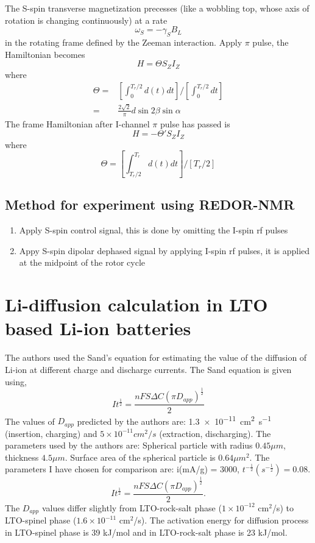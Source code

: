 \documentclass[12pt]{book}
\begin{document}
The S-spin transverse magnetization precesses (like a wobbling top, whose axis of rotation is changing continuously) at a rate
\[
\omega_{S}=-\gamma_{S}B_{L}
\]
in the rotating frame defined by the Zeeman interaction. Apply $\pi$ pulse, the Hamiltonian becomes 
\[
H=\Theta S_{Z}I_{Z}
\]
where 
\begin{align*}
\Theta= & \left[\int_{0}^{T_{r}/2}d\left(t\right)dt\right]/\left[\int_{0}^{T_{r}/2}dt\right]\\
= & \frac{2\sqrt{2}}{\pi}d\sin2\beta\sin\alpha
\end{align*}
The frame Hamiltonian after I-channel $\pi$ pulse has passed is 
\[
H=-\Theta'S_{Z}I_{Z}
\]
where 
\[
\Theta=\left[\int_{T_{r}/2}^{T_{r}}d\left(t\right)dt\right]/\left[T_{r}/2\right]
\]


\subsection{Method for experiment using REDOR-NMR}
\begin{enumerate}
	\item Apply S-spin control signal, this is done by omitting the I-spin rf
	pulses
	\item Appy S-spin dipolar dephased signal by applying I-spin rf pulses,
	it is applied at the midpoint of the rotor cycle
\end{enumerate}

\section{Li-diffusion calculation in LTO based Li-ion batteries}

The authors used the Sand's equation for estimating the value of the diffusion of Li-ion at different charge and discharge currents. The Sand equation is given using,  \[
It^{\frac{1}{2}}=\frac{nFS\Delta C\left(\pi D_{app}\right)^{\frac{1}{2}}}{2}
\]
The values of $D_{app}$ predicted by the authors are: \SI{1.3e-11}{\centi\meter\squared\per\second} (insertion, charging) and $5\times10^{-11}cm^{2}/s$ (extraction, discharging). The parameters used by the authors are: Spherical particle with radius $0.45\mu m$, thickness $4.5\mu m$. Surface area of the spherical particle is $0.64\mu m^{2}$. The parameters I have chosen for comparison are: i(mA/g) = $3000$, $t^{-\frac{1}{2}}\left(s^{-\frac{1}{2}}\right)=0.08$. \[
It^{\frac{1}{2}}=\frac{nFS\Delta C\left(\pi D_{app}\right)^{\frac{1}{2}}}{2}.
\]
The $D_{app}$ values differ slightly from LTO-rock-salt phase ($1\times10^{-12}$ cm$^{2}$/s) to LTO-spinel phase ($1.6\times10^{-11}$ cm$^{2}$/s). The activation energy for diffusion process in LTO-spinel phase is 39 kJ/mol and in LTO-rock-salt phase is 23 kJ/mol.
\end{document}
